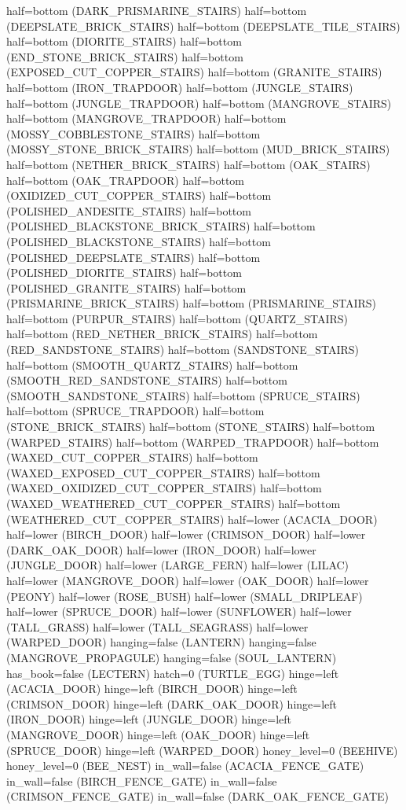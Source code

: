 \documentclass[11pt]{article}
\begin{document}
half=bottom (DARK_PRISMARINE_STAIRS)
half=bottom (DEEPSLATE_BRICK_STAIRS)
half=bottom (DEEPSLATE_TILE_STAIRS)
half=bottom (DIORITE_STAIRS)
half=bottom (END_STONE_BRICK_STAIRS)
half=bottom (EXPOSED_CUT_COPPER_STAIRS)
half=bottom (GRANITE_STAIRS)
half=bottom (IRON_TRAPDOOR)
half=bottom (JUNGLE_STAIRS)
half=bottom (JUNGLE_TRAPDOOR)
half=bottom (MANGROVE_STAIRS)
half=bottom (MANGROVE_TRAPDOOR)
half=bottom (MOSSY_COBBLESTONE_STAIRS)
half=bottom (MOSSY_STONE_BRICK_STAIRS)
half=bottom (MUD_BRICK_STAIRS)
half=bottom (NETHER_BRICK_STAIRS)
half=bottom (OAK_STAIRS)
half=bottom (OAK_TRAPDOOR)
half=bottom (OXIDIZED_CUT_COPPER_STAIRS)
half=bottom (POLISHED_ANDESITE_STAIRS)
half=bottom (POLISHED_BLACKSTONE_BRICK_STAIRS)
half=bottom (POLISHED_BLACKSTONE_STAIRS)
half=bottom (POLISHED_DEEPSLATE_STAIRS)
half=bottom (POLISHED_DIORITE_STAIRS)
half=bottom (POLISHED_GRANITE_STAIRS)
half=bottom (PRISMARINE_BRICK_STAIRS)
half=bottom (PRISMARINE_STAIRS)
half=bottom (PURPUR_STAIRS)
half=bottom (QUARTZ_STAIRS)
half=bottom (RED_NETHER_BRICK_STAIRS)
half=bottom (RED_SANDSTONE_STAIRS)
half=bottom (SANDSTONE_STAIRS)
half=bottom (SMOOTH_QUARTZ_STAIRS)
half=bottom (SMOOTH_RED_SANDSTONE_STAIRS)
half=bottom (SMOOTH_SANDSTONE_STAIRS)
half=bottom (SPRUCE_STAIRS)
half=bottom (SPRUCE_TRAPDOOR)
half=bottom (STONE_BRICK_STAIRS)
half=bottom (STONE_STAIRS)
half=bottom (WARPED_STAIRS)
half=bottom (WARPED_TRAPDOOR)
half=bottom (WAXED_CUT_COPPER_STAIRS)
half=bottom (WAXED_EXPOSED_CUT_COPPER_STAIRS)
half=bottom (WAXED_OXIDIZED_CUT_COPPER_STAIRS)
half=bottom (WAXED_WEATHERED_CUT_COPPER_STAIRS)
half=bottom (WEATHERED_CUT_COPPER_STAIRS)
half=lower (ACACIA_DOOR)
half=lower (BIRCH_DOOR)
half=lower (CRIMSON_DOOR)
half=lower (DARK_OAK_DOOR)
half=lower (IRON_DOOR)
half=lower (JUNGLE_DOOR)
half=lower (LARGE_FERN)
half=lower (LILAC)
half=lower (MANGROVE_DOOR)
half=lower (OAK_DOOR)
half=lower (PEONY)
half=lower (ROSE_BUSH)
half=lower (SMALL_DRIPLEAF)
half=lower (SPRUCE_DOOR)
half=lower (SUNFLOWER)
half=lower (TALL_GRASS)
half=lower (TALL_SEAGRASS)
half=lower (WARPED_DOOR)
hanging=false (LANTERN)
hanging=false (MANGROVE_PROPAGULE)
hanging=false (SOUL_LANTERN)
has_book=false (LECTERN)
hatch=0 (TURTLE_EGG)
hinge=left (ACACIA_DOOR)
hinge=left (BIRCH_DOOR)
hinge=left (CRIMSON_DOOR)
hinge=left (DARK_OAK_DOOR)
hinge=left (IRON_DOOR)
hinge=left (JUNGLE_DOOR)
hinge=left (MANGROVE_DOOR)
hinge=left (OAK_DOOR)
hinge=left (SPRUCE_DOOR)
hinge=left (WARPED_DOOR)
honey_level=0 (BEEHIVE)
honey_level=0 (BEE_NEST)
in_wall=false (ACACIA_FENCE_GATE)
in_wall=false (BIRCH_FENCE_GATE)
in_wall=false (CRIMSON_FENCE_GATE)
in_wall=false (DARK_OAK_FENCE_GATE)
\end{document}

